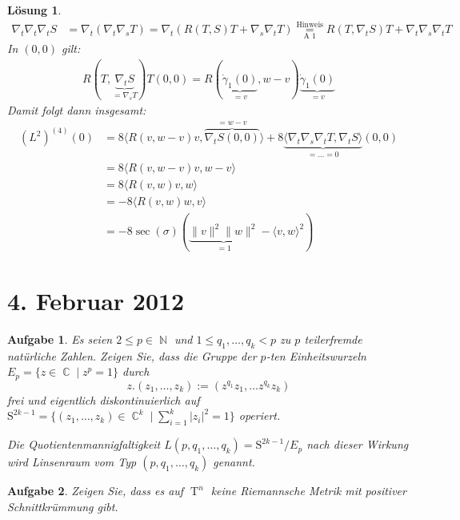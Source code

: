 \documentclass[paper=A4, twoside, chapterprefix=true, bibliography=totoc, headsepline]{scrbook}
\DeclareMathOperator{\C}{\mathbb{C}}
\DeclareMathOperator{\N}{\mathbb{N}}
\DeclareMathOperator{\T}{T}         %
\theoremstyle{plain}
\theoremstyle{nonumberplain}
\theoremstyle{empty}
\theoremstyle{break}
\newtheorem{Aufg}{Aufgabe}
\newtheorem{Loes}{L\"osung}
\begin{document}
\begin{Loes}
\begin{align*}
	\nabla_t\nabla_t\nabla_t S &= \nabla_t (\nabla_t \nabla_s T) = \nabla_t (R(T,S)T + \nabla_s \nabla_t T) \overset{\text{Hinweis}}{\underset{\text{A 1}}{=}} R(T, \nabla_t S) T + \nabla_t \nabla_s \nabla_t T
\end{align*}
In $(0,0)$ gilt:
\begin{align*}
	R (T, \underbrace{\nabla_t S}_{= \nabla_s T}) T (0,0) = R(\underbrace{\dot\gamma_1(0)}_{=v}, w - v) \underbrace{\dot\gamma_1(0)}_{=v}
\end{align*}
Damit folgt dann insgesamt:
\begin{align*}
	(L^2)^{(4)}(0) &= 8 \langle R(v, w - v) v, \overbrace{\nabla_t S(0,0)}^{=w-v} \rangle + 8 \underbrace{\langle \nabla_t\nabla_s\nabla_t T, \nabla_t S \rangle}_{= \ldots = 0} (0,0) \\
	&= 8 \langle R(v, w - v) v, w - v \rangle \\
	&= 8 \langle R(v, w) v, w \rangle \\
	&= -8 \langle R(v, w) w, v \rangle \\
	&= -8 \sec(\sigma) (\underbrace{\|v\|^2 \|w\|^2}_{=1} - \langle v, w \rangle^2)
\end{align*}
\end{Loes}


\section{4. Februar 2012}
\setcounter{Aufg}{0} %
\setcounter{Loes}{0}

\begin{Aufg}
Es seien $2\leq p \in \N$ und $1\leq q_1,\dots,q_k<p$ zu $p$ teilerfremde natürliche Zahlen. Zeigen Sie, dass die Gruppe der $p$-ten Einheitswurzeln $E_p=\{z \in \C \mid z^p=1\}$ durch
	\[z.(z_1,\dots, z_k):=(z^{q_1}z_1,\dots z^{q_k} z_k)\]
frei und eigentlich diskontinuierlich auf $\mathrm{S}^{2k-1}=\{(z_1, \dots, z_k) \in \C^k \mid \sum_{i=1}^k |z_i|^2 =1\}$ operiert.

Die Quotientenmannigfaltigkeit $L(p,q_1,\dots, q_k)=\mathrm{S}^{2k-1}/E_p$ nach dieser Wirkung wird \emph{Linsenraum} vom Typ $(p,q_1,\dots,q_k)$ genannt.
\end{Aufg}

\begin{Aufg}
Zeigen Sie, dass es auf $\T^n$ keine Riemannsche Metrik mit positiver Schnittkrümmung gibt.
\end{Aufg}
\end{document}
